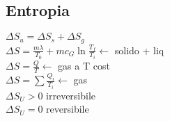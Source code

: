\documentclass[8pt]{scrreprt}
\begin{document}
\begin{multicols*}{3}
\vspace{-3mm}
\subsection*{Entropia}
$\Delta S_u = \Delta S_s + \Delta S_g$\\
$\Delta S = \frac{m \lambda}{T_0} + mc_G \ln \frac{T_f}{T_i}\leftarrow$ solido + liq\\
$\Delta S = \frac{Q}{T} \leftarrow$ gas a T cost\\
$\Delta S = \sum \frac{Q_i}{T_i} \leftarrow$ gas\\
$\Delta S_U > 0$ irreversibile\\
$\Delta S_U = 0$ reversibile\\

\end{multicols*}
\end{document}
